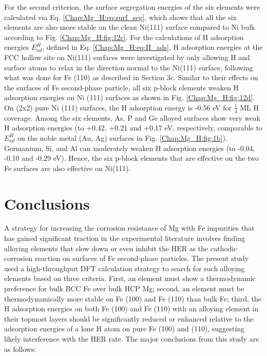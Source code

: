 For the second criterion, the surface segregation energies of the six elements were calculated via Eq. \ref{Chap:Mg_H:eq:surf_seg}, which shows that all the six elements are also more stable on the clean Ni(111) surface compared to Ni bulk according to Fig. \ref{Chap:Mg_H:fig:12c}. For the calculations of H adsorption energies $E_{ad}^H$, defined in Eq. \ref{Chap:Mg_H:eq:H_ads}, H adsorption energies at the FCC hollow site on Ni(111) surfaces were investigated by only allowing H and surface atoms to relax in the direction normal to the Ni(111) surface, following what was done for Fe (110) as described in Section 3c. Similar to their effects on the surfaces of Fe second-phase particle, all six p-block elements weaken H adsorption energies on Ni (111) surfaces as shown in Fig. \ref{Chap:Mg_H:fig:12d}. On (2x2) pure Ni (111) surfaces, the H adsorption energy is -0.56 eV for $\frac{1}{4}$ ML H coverage. Among the six elements, As, P and Ge alloyed surfaces show very weak H adsorption energies (to +0.42, +0.21 and +0.17 eV, respectively, comparable to $E_{ad}^H$ on the noble metal (Au, Ag) surfaces in Fig. \ref{Chap:Mg_H:fig:1b}). Germanium, Si, and Al can moderately weaken H adsorption energies (to -0.04, -0.10 and -0.29 eV). Hence, the six p-block elements that are effective on the two Fe surfaces are also effective on Ni(111).

\section{Conclusions}

A strategy for increasing the corrosion resistance of Mg with Fe impurities that has gained significant traction in the experimental literature involves finding alloying elements that slow down or even inhibit the HER as the cathodic corrosion reaction on surfaces of Fe second-phase particles. The present study used a high-throughput DFT calculation strategy to search for such alloying elements based on three criteria. First, an element must show a thermodynamic preference for bulk BCC Fe over bulk HCP Mg; second, an element must be thermodynamically more stable on Fe (100) and Fe (110) than bulk Fe; third, the H adsorption energies on both Fe (100) and Fe (110) with an alloying element in their topmost layers should be significantly reduced or enhanced relative to the adsorption energies of a lone H atom on pure Fe (100) and (110), suggesting likely interference with the HER rate. The major conclusions from this study are as follows:

